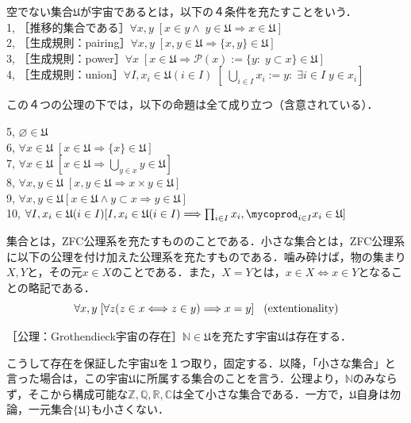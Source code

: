 \documentclass[uplatex, 12pt, a4paper, dvipdfmx]{jsarticle}
\let\coprod\mycoprod
\begin{document}
\begin{shadebox}\begin{definition}[Grothendieck宇宙]
    空でない集合$\mathfrak{U}$が宇宙であるとは，以下の４条件を充たすことをいう．\\
    1, ［推移的集合である］$\forall x,y \; [x\in y \wedge \; y\in \mathfrak{U} \Longrightarrow x\in \mathfrak{U}]$\\
    2, ［生成規則：pairing］$\forall x,y \; [x,y\in \mathfrak{U} \Longrightarrow \{ x,y\} \in \mathfrak{U}]$\\
    3, ［生成規則：power］$\forall x \; [x\in\mathfrak{U} \Longrightarrow \mathcal{P}(x):=\{ y:\; y \subset x\} \in \mathfrak{U}]$\\
    4, ［生成規則：union］$\forall I,x_i \in \mathfrak{U}(i\in I) \; [\; \bigcup_{i\in I} x_i := {y:\; \exists i\in I \; y\in x_i}]$
\end{definition}\end{shadebox}

この４つの公理の下では，以下の命題は全て成り立つ（含意されている）．
\begin{shadebox}
    5, $\varnothing\in\mathfrak{U}$\\
    6, $\forall x\in\mathfrak{U} \; [x\in\mathfrak{U}\Longrightarrow \{ x \} \in \mathfrak{U}]$\\
    7, $\forall x\in\mathfrak{U} \; [x\in\mathfrak{U}\Longrightarrow \bigcup_{y\in x}y\in\mathfrak{U}]$\\
    8, $\forall x,y\in\mathfrak{U} \; [x,y \in\mathfrak{U}\Longrightarrow x\times y\in\mathfrak{U}]$\\
    9, $\forall x,y\in\mathfrak{U} [x\in\mathfrak{U} \wedge y\subset x \Longrightarrow y\in\mathfrak{U}]$\\
    10, $\forall I,x_i\in\mathfrak{U}(i\in I) [I,x_i\in\mathfrak{U}(i\in I)\Longrightarrow \prod_{i\in I}x_i , \coprod_{i\in I}x_i\in\mathfrak{U}]$
\end{shadebox}

\begin{shadebox}\begin{definition}[（小さな）集合]集合とは，ZFC公理系を充たすもののことである．小さな集合とは，ZFC公理系に以下の公理を付け加えた公理系を充たすものである．噛み砕けば，物の集まり$X,Y$と，その元$x\in X$のことである．また，$X=Y$とは，$x\in X \Longleftrightarrow x \in Y$となることの略記である．$$\forall x,y \; [ \forall z (z\in x \Longleftrightarrow z\in y) \Longrightarrow x=y ] \hspace{3mm}\mathrm{(extentionality)}$$
\begin{center}［公理：\rm{Grothendieck宇宙の存在}］$\mathbb{N}\in\mathfrak{U}$を充たす宇宙$\mathfrak{U}$は存在する．\end{center} \vspace{1mm}
\end{definition}\end{shadebox}
こうして存在を保証した宇宙$\mathfrak{U}$を１つ取り，固定する．以降，「小さな集合」と言った場合は，この宇宙$\mathfrak{U}$に所属する集合のことを言う．公理より，$\mathbb{N}$のみならず，そこから構成可能な$\mathbb{Z,Q,R,C}$は全て小さな集合である．一方で，$\mathfrak{U}$自身は勿論，一元集合$\{ \mathfrak{U} \}$も小さくない．
\end{document}
